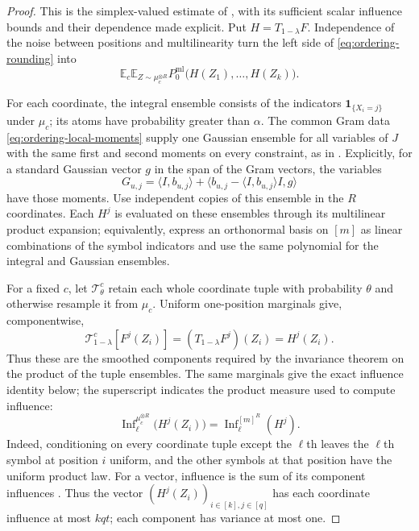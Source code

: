 \begin{proof}
This is the simplex-valued estimate of
\cite[Lemma~10.5]{GuruswamiEtAl2011OrderingCSP}, with its sufficient
scalar influence bounds and their dependence made explicit.  Put
\(H=T_{1-\lambda}F\).  Independence of the noise between positions
and multilinearity turn the left side of
\eqref{eq:ordering-rounding} into
\begin{equation}
 \mathbb E_c\mathbb E_{Z\sim\mu_c^{\otimes R}}
 P_0^{\mathrm{ml}}\bigl(H(Z_1),\ldots,H(Z_k)\bigr).
\label{eq:ordering-noise-factorization}
\end{equation}

For each coordinate, the integral ensemble consists of the indicators
\(\mathbf1_{\{X_i=j\}}\) under \(\mu_c\); its atoms have probability
greater than \(\alpha\).  The common Gram data
\eqref{eq:ordering-local-moments} supply one Gaussian ensemble for all
variables of \(J\) with the same first and second moments on every
constraint, as in \cite[Lemma~10.4]{GuruswamiEtAl2011OrderingCSP}.
Explicitly, for a standard Gaussian vector \(g\) in the span of the
Gram vectors, the variables
\[
 G_{u,j}=\langle I,b_{u,j}\rangle+
   \langle b_{u,j}-\langle I,b_{u,j}\rangle I,g\rangle
\]
have those moments.  Use independent copies of this ensemble in the
\(R\) coordinates.  Each \(H^j\) is evaluated on these ensembles
through its multilinear product expansion; equivalently, express an
orthonormal basis on \([m]\) as linear combinations of the symbol
indicators and use the same polynomial for the integral and Gaussian
ensembles.

For a fixed \(c\), let \(\mathcal T_\theta^c\) retain each whole
coordinate tuple with probability \(\theta\) and otherwise resample it
from \(\mu_c\).  Uniform one-position marginals give, componentwise,
\[
 \mathcal T_{1-\lambda}^c[F^j(Z_i)]
 =(T_{1-\lambda}F^j)(Z_i)=H^j(Z_i).
\]
Thus these are the smoothed components required by the invariance
theorem on the product of the tuple ensembles.  The same marginals
give the exact influence identity below; the superscript indicates the
product measure used to compute influence:
\begin{equation}
 \operatorname{Inf}^{\mu_c^{\otimes R}}_\ell
       \bigl(H^j(Z_i)\bigr)
 =
 \operatorname{Inf}^{[m]^R}_\ell(H^j).
\label{eq:ordering-vector-influence}
\end{equation}
Indeed, conditioning on every coordinate tuple except the \(\ell\)th
leaves the \(\ell\)th symbol at position \(i\) uniform, and the other
symbols at that position have the uniform product law.  For a vector,
influence is the sum of its component influences
\cite[Definition~2.6]{IsakssonMossel2009}.  Thus the vector
\((H^j(Z_i))_{i\in[k],j\in[q]}\) has each coordinate influence at
most \(kqt\); each component has variance at most one.


\end{proof}
